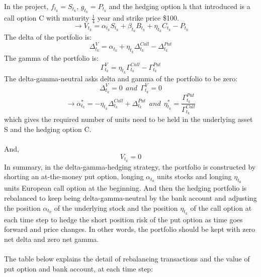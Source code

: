\documentclass[12pt]{article}
\begin{document}
In the project, ${f_{t_k}} = {S_{t_k}}$, ${g_{t_k}} = {P_{t_k}}$ and the hedging option h that introduced is a call option C with maturity $\frac{1}{4}$ year and strike price \$100.
\begin{equation}
    \longrightarrow {V_{t_k}} = {{\alpha}_{t_k}} {S_{t_k}} + {{\beta}_{t_k}} {B_{t_k}} +{\eta}_{t_k}{C_{t_k}} - {P_{t_k}}
\end{equation}
The delta of the portfolio is:
\begin{equation}
    {\Delta^{V}_{t_k}} = {\alpha_{t_k}} + {{\eta}_{t_k}}{\Delta^{Call}_{t_k}} - {\Delta^{Put}_{t_k}}
\end{equation}
The gamma of the portfolio is:
\begin{equation}
    {\Gamma^{V}_{t_k}} = {{\eta}_{t_k}}{\Gamma^{Call}_{t_k}} - {\Gamma^{Put}_{t_k}}
\end{equation}
The delta-gamma-neutral asks delta and gamma of the portfolio to be zero:
\begin{equation}
    {\Delta^{V}_{t_k}} = 0 
    ~~ and ~~ 
    {\Gamma^{V}_{t_k}} = 0
\end{equation}
\begin{equation}
    \longrightarrow {\alpha^*_{t_k}} = -{{\eta}_{t_k}}{\Delta^{Call}_{t_k}} + {\Delta^{Put}_{t_k}}
    ~~ and ~~ 
    {{\eta}^*_{t_k}} = \frac{\Gamma^{Put}_{t_k}}{\Gamma^{Call}_{t_k}}
\end{equation}
which gives the required number of units need to be held in the underlying asset S and the hedging option C.\\
\\And,
\begin{equation}
    {V_{t_k}} = 0
\end{equation}
In summary, in the delta-gamma-hedging strategy, the portfolio is constructed by shorting an at-the-money put option, longing ${\alpha_{t_0}}$ units stocks and longing ${\eta_{t_0}}$ units European call option at the beginning. And then the hedging portfolio is rebalanced to keep being delta-gamma-neutral by the bank account and adjusting the position ${\alpha_{t_k}}$ of the underlying stock and the position ${\eta_{t_k}}$ of the call option at each time step to hedge the short position risk of the put option as time goes forward and price changes. In other words, the portfolio should be kept with zero net delta and zero net gamma.\\
\\The table below explains the detail of rebalancing transactions and the value of put option and bank account, at each time step:\\
\end{document}
